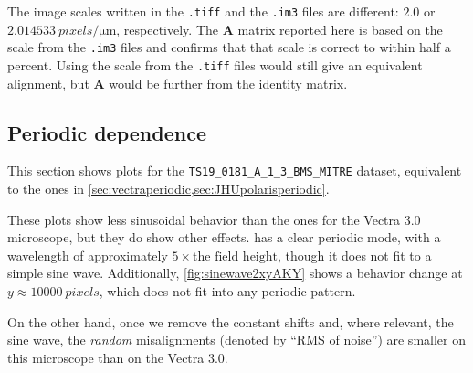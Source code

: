 \documentclass{article}
\newcommand{\matrixbold}[1]{\mathbf{#1}}
\begin{document}
The image scales written in the \texttt{.tiff} and the \texttt{.im3} files are different: $2.0$ or $\SI{2.014533}{pixels\per\micro\meter}$, respectively.  The $\matrixbold{A}$ matrix reported here is based on the scale from the \texttt{.im3} files and confirms that that scale is correct to within half a percent.  Using the scale from the \texttt{.tiff} files would still give an equivalent alignment, but $\matrixbold{A}$ would be further from the identity matrix.

\subsection{Periodic dependence}
\label{sec:akoyapolarisperiodic}

This section shows plots for the \texttt{TS19\_0181\_A\_1\_3\_BMS\_MITRE} dataset, equivalent to the ones in \cref{sec:vectraperiodic,sec:JHUpolarisperiodic}.

These plots show less sinusoidal behavior than the ones for the Vectra 3.0 microscope, but they do show other effects.   has a clear periodic mode, with a wavelength of approximately $5\times\text{the field height}$, though it does not fit to a simple sine wave.  Additionally, \cref{fig:sinewave2xyAKY} shows a behavior change at $y\approx\SI{10000}{pixels}$, which does not fit into any periodic pattern.

On the other hand, once we remove the constant shifts and, where relevant, the sine wave, the \emph{random} misalignments (denoted by ``RMS of noise'') are smaller on this microscope than on the Vectra 3.0.
\end{document}
